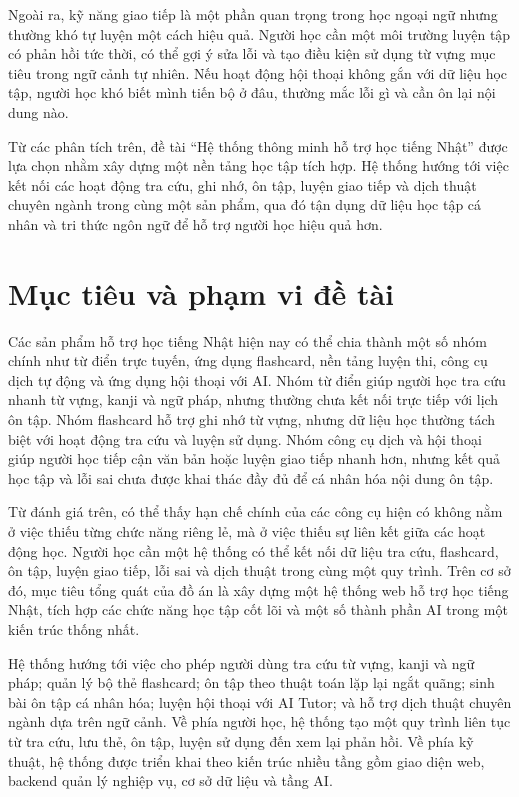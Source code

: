 \documentclass[../DoAn.tex]{subfiles}
\begin{document}
Ngoài ra, kỹ năng giao tiếp là một phần quan trọng trong học ngoại ngữ nhưng thường khó tự luyện một cách hiệu quả. Người học cần một môi trường luyện tập có phản hồi tức thời, có thể gợi ý sửa lỗi và tạo điều kiện sử dụng từ vựng mục tiêu trong ngữ cảnh tự nhiên. Nếu hoạt động hội thoại không gắn với dữ liệu học tập, người học khó biết mình tiến bộ ở đâu, thường mắc lỗi gì và cần ôn lại nội dung nào.

Từ các phân tích trên, đề tài ``Hệ thống thông minh hỗ trợ học tiếng Nhật'' được lựa chọn nhằm xây dựng một nền tảng học tập tích hợp. Hệ thống hướng tới việc kết nối các hoạt động tra cứu, ghi nhớ, ôn tập, luyện giao tiếp và dịch thuật chuyên ngành trong cùng một sản phẩm, qua đó tận dụng dữ liệu học tập cá nhân và tri thức ngôn ngữ để hỗ trợ người học hiệu quả hơn.

\section{Mục tiêu và phạm vi đề tài}
\label{section:1.2}

Các sản phẩm hỗ trợ học tiếng Nhật hiện nay có thể chia thành một số nhóm chính như từ điển trực tuyến, ứng dụng flashcard, nền tảng luyện thi, công cụ dịch tự động và ứng dụng hội thoại với AI. Nhóm từ điển giúp người học tra cứu nhanh từ vựng, kanji và ngữ pháp, nhưng thường chưa kết nối trực tiếp với lịch ôn tập. Nhóm flashcard hỗ trợ ghi nhớ từ vựng, nhưng dữ liệu học thường tách biệt với hoạt động tra cứu và luyện sử dụng. Nhóm công cụ dịch và hội thoại giúp người học tiếp cận văn bản hoặc luyện giao tiếp nhanh hơn, nhưng kết quả học tập và lỗi sai chưa được khai thác đầy đủ để cá nhân hóa nội dung ôn tập.

Từ đánh giá trên, có thể thấy hạn chế chính của các công cụ hiện có không nằm ở việc thiếu từng chức năng riêng lẻ, mà ở việc thiếu sự liên kết giữa các hoạt động học. Người học cần một hệ thống có thể kết nối dữ liệu tra cứu, flashcard, ôn tập, luyện giao tiếp, lỗi sai và dịch thuật trong cùng một quy trình. Trên cơ sở đó, mục tiêu tổng quát của đồ án là xây dựng một hệ thống web hỗ trợ học tiếng Nhật, tích hợp các chức năng học tập cốt lõi và một số thành phần AI trong một kiến trúc thống nhất.

Hệ thống hướng tới việc cho phép người dùng tra cứu từ vựng, kanji và ngữ pháp; quản lý bộ thẻ flashcard; ôn tập theo thuật toán lặp lại ngắt quãng; sinh bài ôn tập cá nhân hóa; luyện hội thoại với AI Tutor; và hỗ trợ dịch thuật chuyên ngành dựa trên ngữ cảnh. Về phía người học, hệ thống tạo một quy trình liên tục từ tra cứu, lưu thẻ, ôn tập, luyện sử dụng đến xem lại phản hồi. Về phía kỹ thuật, hệ thống được triển khai theo kiến trúc nhiều tầng gồm giao diện web, backend quản lý nghiệp vụ, cơ sở dữ liệu và tầng AI.
\end{document}
